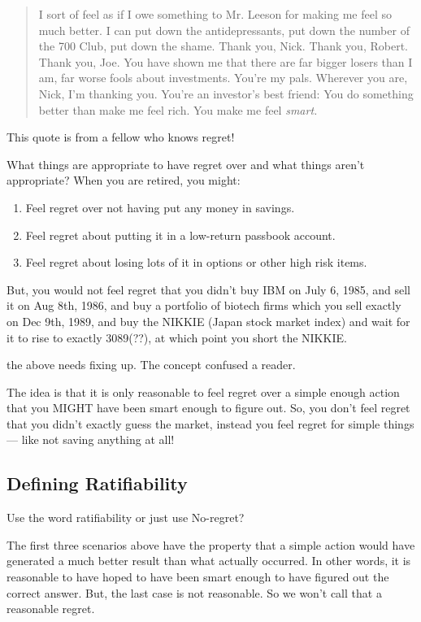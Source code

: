 \documentclass{book}
\newcommand{\notes}{\index{personal notes}}
\begin{document}
\begin{quote}
{I sort of feel as if I owe something to Mr. Leeson for making me feel
so much better.  I can put down the antidepressants, put down the
number of the 700 Club, put down the shame.  Thank you, Nick.  Thank
you, Robert.  Thank you, Joe.  You have shown me that there are far
bigger losers than I am, far worse fools about investments.  You're my
pals.  Wherever you are, Nick, I'm thanking you.   You're an
investor's best friend: You do something better than make me feel
rich.  You make me feel {\em smart.} }
\end{quote}

This quote is from a fellow who knows regret!  


What things are appropriate to have regret over and what things aren't
appropriate?  When you are retired, you might:
\begin{enumerate}
\item Feel regret over not having put any
money in savings.  
\item  Feel regret about putting it in a low-return
  passbook account. 
\item  Feel regret about losing lots of it in options or
  other high risk items.  
\end{enumerate}

But, you would not feel regret that you didn't buy IBM on
  July 6, 1985, and sell it on Aug 8th, 1986, and buy a portfolio of
  biotech firms which you sell exactly on Dec 9th, 1989, and buy the
  NIKKIE (Japan stock market index) and wait for it to rise to exactly
  3089(??), at which point you short the NIKKIE.

{\notes the above needs fixing up.  The concept confused a reader.}

The idea is that it is only reasonable to feel regret over a simple
enough action that you MIGHT have been smart enough to figure out.
So, you don't feel regret that you didn't exactly guess the market,
instead you feel regret for simple things --- like not saving anything at
all!
 
        \subsection{Defining Ratifiability}

{\notes Use the word ratifiability or just use No-regret?}

The first three scenarios above have the property that a simple action
would have generated a much better result than what actually occurred.
In other words, it is reasonable to have hoped to have been smart
enough to have figured out the correct answer.  But, the last case is
not reasonable.  So we won't call that a reasonable regret. 
\end{document}

